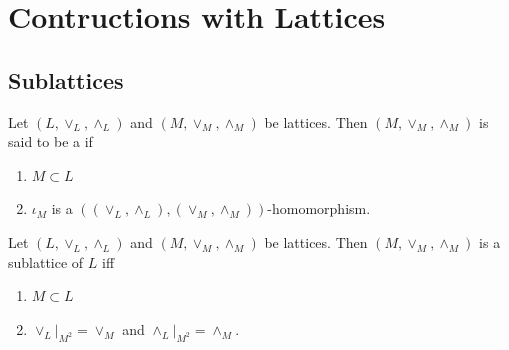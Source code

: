 \documentclass{book}
\begin{document}
	
	
	
	
	
	
	
	
	
	
	
	
	
	
	\section{Contructions with Lattices}
	
	\subsection{Sublattices}
	
	\begin{defn}
		Let $(L, \vee_L, \wedge_L)$ and $(M, \vee_M, \wedge_M)$ be lattices. Then $(M, \vee_M, \wedge_M)$ is said to be a  if
		\begin{enumerate}
			\item $M \subset L$
			\item $\iota_M$ is a $((\vee_L, \wedge_L), (\vee_M, \wedge_M))$-homomorphism.
		\end{enumerate}  
	\end{defn}
	
	\begin{ex}
		Let $(L, \vee_L, \wedge_L)$ and $(M, \vee_M, \wedge_M)$ be lattices. Then $(M, \vee_M, \wedge_M)$ is a sublattice of $L$ iff
		\begin{enumerate}
			\item $M \subset L$
			\item $\vee_L|_{M^2} = \vee_M$ and $\wedge_L|_{M^2} = \wedge_M$. 
		\end{enumerate}  
	\end{ex}
	
\end{document}
